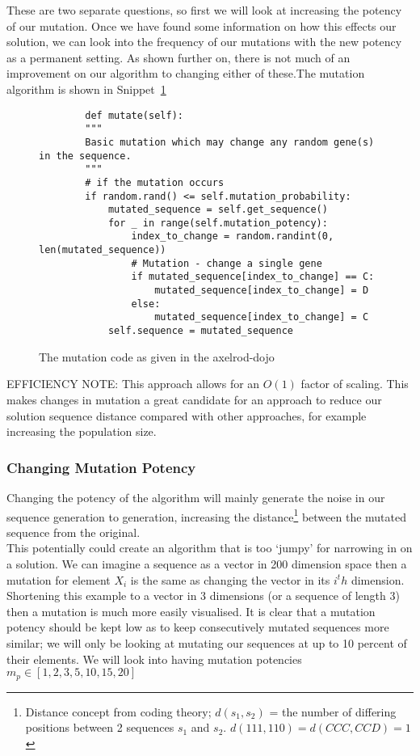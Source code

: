 These are two separate questions, so first we will look at increasing the potency of our mutation.
Once we have found some information on how this effects our solution, we can look into the frequency of our mutations with the new potency as a permanent setting.
As shown further on, there is not much of an improvement on our algorithm to changing either of these.The mutation algorithm is shown in Snippet~\ref{code:mutate}\\
\begin{figure}[ht] 
    \begin{verbatim}
        def mutate(self):
        """
        Basic mutation which may change any random gene(s) in the sequence.
        """
        # if the mutation occurs
        if random.rand() <= self.mutation_probability:
            mutated_sequence = self.get_sequence()
            for _ in range(self.mutation_potency):
                index_to_change = random.randint(0, len(mutated_sequence))
                # Mutation - change a single gene
                if mutated_sequence[index_to_change] == C:
                    mutated_sequence[index_to_change] = D
                else:
                    mutated_sequence[index_to_change] = C
            self.sequence = mutated_sequence
    \end{verbatim}
    \caption{The mutation code as given in the axelrod-dojo}\label{code:mutate}    
\end{figure}

EFFICIENCY NOTE\@: This approach allows for an \(O(1)\) factor of scaling.
This makes changes in mutation a great candidate for an approach to reduce our solution sequence distance compared with other approaches, for example increasing the population size.\\

\subsubsection{Changing Mutation Potency}
Changing the potency of the algorithm will mainly generate the noise in our sequence generation to generation, increasing the distance\footnote{Distance concept from coding theory; \(d(s_1,s_2)\) = the number of differing positions between 2 sequences \(s_1\) and \(s_2\). \(d(111,110) = d(CCC,CCD) = 1 \)} between the mutated sequence from the original.\\

This potentially could create an algorithm that is too `jumpy' for narrowing in on a solution.
We can imagine a sequence as a vector in 200 dimension space then a mutation for element \(X_i\) is the same as changing the vector in its \(i^th\) dimension.
Shortening this example to a vector in 3 dimensions (or a sequence of length 3) then a mutation is much more easily visualised.
It is clear that a mutation potency should be kept low as to keep consecutively mutated sequences more similar;
we will only be looking at mutating our sequences at up to 10 percent of their elements.
We will look into having mutation potencies \(m_p \in [1,2,3,5,10,15,20]\)\\

